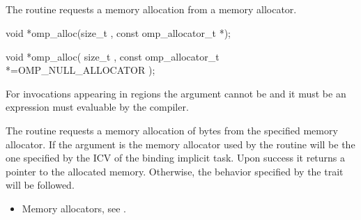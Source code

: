\begin{ccppspecific}

\subsection{}
\label{subsec:omp_alloc}

\summary
The  routine requests a memory allocation from a memory allocator.

\format
\begin{cspecific}
\begin{ompcFunction}
void *omp_alloc(size_t , const omp_allocator_t *);
\end{ompcFunction}
\end{cspecific}
\begin{cppspecific}
\begin{ompcFunction}
void *omp_alloc(
  size_t ,
  const omp_allocator_t *=OMP_NULL_ALLOCATOR
);
\end{ompcFunction}
\end{cppspecific}

\constraints

For  invocations appearing in  regions the  argument cannot be  and it must be an expression must evaluable by the compiler.

\effect

The  routine requests a memory allocation of  bytes from the specified memory allocator. If the  argument is
 the memory allocator used by the routine will be the one specified by the  ICV of the binding implicit task.
Upon success it returns a pointer to the allocated memory. Otherwise, the behavior specified by the  trait will be followed.

\crossreferences
\begin{itemize}
\item Memory allocators, see .
\end{itemize}

\subsection{}
\label{subsec:omp_free}


\end{ccppspecific}
